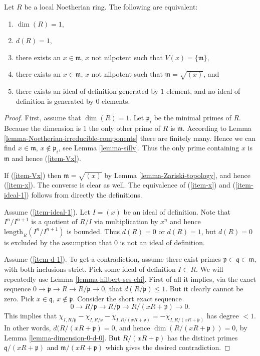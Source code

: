 \begin{lemma}
\label{lemma-height-1}
Let $R$ be a local Noetherian ring.
The following are equivalent:
\begin{enumerate}
\item $\dim(R) = 1$,
\label{item-dim-1}
\item $d(R) = 1$,
\label{item-d-1}
\item there exists an $x \in \mathfrak m$, $x$ not nilpotent
such that $V(x) = \{\mathfrak m\}$,
\label{item-Vx}
\item there exists an $x \in \mathfrak m$, $x$ not nilpotent
such that $\mathfrak m = \sqrt{(x)}$, and
\label{item-x}
\item there exists an ideal of definition generated by $1$ element,
and no ideal of definition is generated by $0$ elements.
\label{item-ideal-1}
\end{enumerate}
\end{lemma}

\begin{proof}
First, assume that $\dim(R) = 1$.
Let $\mathfrak p_i$ be the minimal primes of $R$.
Because the dimension is $1$ the only other prime of $R$
is $\mathfrak m$.
According to Lemma \ref{lemma-Noetherian-irreducible-components}
there are finitely many. Hence we can find $x \in \mathfrak m$,
$x \not \in \mathfrak p_i$, see Lemma \ref{lemma-silly}.
Thus the only prime containing $x$ is $\mathfrak m$ and
hence (\ref{item-Vx}).

\medskip\noindent
If (\ref{item-Vx}) then $\mathfrak m = \sqrt{(x)}$ by
Lemma \ref{lemma-Zariski-topology}, and hence (\ref{item-x}).
The converse is clear as well.
The equivalence of (\ref{item-x}) and (\ref{item-ideal-1}) follows
from directly the definitions.

\medskip\noindent
Assume (\ref{item-ideal-1}).
Let $I = (x)$ be an ideal of definition.
Note that $I^n/I^{n + 1}$ is a quotient of $R/I$ via multiplication
by $x^n$ and hence $\text{length}_R(I^n/I^{n + 1})$ is bounded.
Thus $d(R) = 0$ or $d(R) = 1$, but $d(R) = 0$ is excluded
by the assumption that $0$ is not an ideal of definition.

\medskip\noindent
Assume (\ref{item-d-1}). To get a contradiction, assume there
exist primes $\mathfrak p \subset \mathfrak q \subset \mathfrak m$,
with both inclusions strict. Pick some ideal of definition $I \subset R$.
We will repeatedly use
Lemma \ref{lemma-hilbert-ses-chi}. First of all
it implies, via the exact sequence
$0 \to \mathfrak p \to R \to R/\mathfrak p \to 0$,
that $d(R/\mathfrak p) \leq 1$. But it clearly cannot
be zero. Pick $x\in \mathfrak q$, $x\not \in \mathfrak p$.
Consider the short exact sequence
$$
0 \to R/\mathfrak p \to R/\mathfrak p \to R/(xR + \mathfrak p) \to 0.
$$
This implies that $\chi_{I, R/\mathfrak p} - \chi_{I, R/\mathfrak p}
- \chi_{I, R/(xR + \mathfrak p)} = - \chi_{I, R/(xR + \mathfrak p)}$
has degree $ < 1$. In other words, $d(R/(xR + \mathfrak p) = 0$,
and hence $\dim(R/(xR + \mathfrak p)) = 0$, by
Lemma \ref{lemma-dimension-0-d-0}. But $R/(xR + \mathfrak p)$
has the distinct primes $\mathfrak q/(xR + \mathfrak p)$ and
$\mathfrak m/(xR + \mathfrak p)$ which gives the desired contradiction.
\end{proof}

